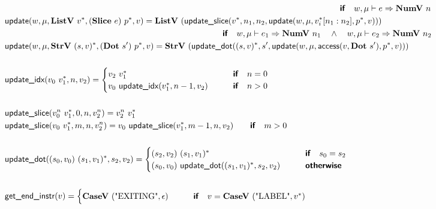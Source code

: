 \begin{align*}
  &\qquad\qquad\qquad\qquad\qquad\qquad\qquad\qquad\qquad\qquad\qquad\qquad\qquad\qquad\qquad\qquad\qquad\qquad\qquad\qquad\premise{if}\quad
  w, \mu \vdash e \Rightarrow \numv ~ n \\
  &\update(w, \mu, \listv ~ \seq{v}, (\slicep ~ e) ~ \seq{p}, v) =
  \listv ~ (\updateslice(\seq v, n_1, n_2, \update(w, \mu, \seq{v_i}[n_1: n_2], \seq{p}, v))) \\
  &\qquad\qquad\qquad\qquad\qquad\qquad\qquad\qquad\qquad\qquad\qquad\qquad\qquad\premise{if}\quad
  w, \mu \vdash e_1 \Rightarrow \numv ~ n_1 \quad\land\quad
  w, \mu \vdash e_2 \Rightarrow \numv ~ n_2 \\
  &\update(w, \mu, \strv ~ \seq{(s, v)}, (\dotp ~ s') ~ \seq{p}, v)
  =
  \strv ~ (\updatedot(\seq{(s, v)}, s', \update(w, \mu, \access(v, \dotp ~ s'), \seq{p}, v))) \\
%
\newline \\
  &\updateidx(v_0 ~ \seq{v_1}, n, v_2) =
  \begin{cases}
    v_2 ~ \seq{v_1}
    &\quad\quad\premise{if}\quad n = 0 \\
    v_0 ~ \updateidx(\seq{v_1}, n-1, v_2)
    &\quad\quad\premise{if}\quad n > 0 \\
  \end{cases} \\
%
\newline \\
  &\updateslice(v_0^n ~ \seq{v_1}, 0, n, v_2^n) = v_2^n ~ \seq{v_1} \\
  &\updateslice(v_0 ~ \seq{v_1}, m, n, v_2^n) =  v_0 ~ \updateslice(\seq{v_1}, m-1, n, v_2)
  \quad\quad\premise{if}\quad m > 0 \\
%
\newline \\
  &\updatedot((s_0, v_0) ~ \seq{(s_1, v_1)}, s_2, v_2) =
  \begin{cases}
    (s_2, v_2) ~ \seq{(s_1, v_1)}
    &\quad\quad\premise{if}\quad s_0 = s_2 \\
    (s_0, v_0) ~ \updatedot(\seq{(s_1, v_1)}, s_2, v_2)
    &\quad\quad\premise{otherwise}
  \end{cases}
  \\
%
\newline \\
  &\getendinstr(v) =
  \begin{cases}
    \casev ~ (\text{"EXITING"}, \epsilon) &\quad\quad\premise{if}\quad v = \casev ~ (\text{"LABEL"}, \seq v)\\

\end{cases}
\end{align*}
